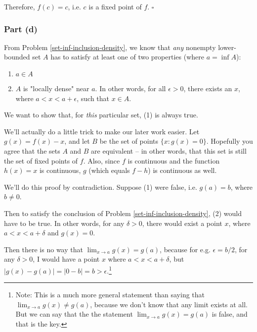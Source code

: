
Therefore, $f(c) = c$, i.e. $c$ is a fixed point of $f$. $\square$

\subsubsection{Part (d)}

From Problem \ref{set-inf-inclusion-density}, we know that \textit{any} nonempty lower-bounded set $A$ has to satisfy at least one of two properties (where $a = \inf A$):
 
\begin{enumerate}[(1)]
\item $a \in A$
\item $A$ is "locally dense" near $a$. In other words, for all $\epsilon > 0$, there exists an $x$, where $a < x < a + \epsilon$, such that $x \in A$. 
\end{enumerate}

We want to show that, for \textit{this} particular set, (1) is always true. 

We'll actually do a little trick to make our later work easier. Let $g(x) = f(x) - x$, and let $B$ be the set of points $\{x : g(x) = 0\}$. Hopefully you agree that the sets $A$ and $B$ are equivalent -- in other words, that this set is still the set of fixed points of $f$. Also, since $f$ is continuous and the function $h(x) = x$ is continuous, $g$ (which equals $f - h$) is continuous as well. 

\vspace{10mm}
We'll do this proof by contradiction. Suppose (1) were false, i.e. $g(a) = b$, where $b \neq 0$.

Then to satisfy the conclusion of Problem \ref{set-inf-inclusion-density}, (2) would have to be true. In other words, for any $\delta > 0$, there would exist a point $x$, where $a < x < a + \delta$ and $g(x) = 0$. 

Then there is no way that $\lim_{x \rightarrow a} g(x) = g(a)$, because for e.g. $\epsilon = b/2$, for any $\delta > 0$, I would have a point $x$ where $a < x < a + \delta$, but $|g(x) - g(a)| = |0 - b| = b > \epsilon$.\footnote{Note: This is a much more general statement than saying that $\lim_{x \rightarrow a} g(x) \neq g(a)$, because we don't know that any limit exists at all. But we can say that the the statement $\lim_{x \rightarrow a} g(x) = g(a)$ is false, and that is the key.}

